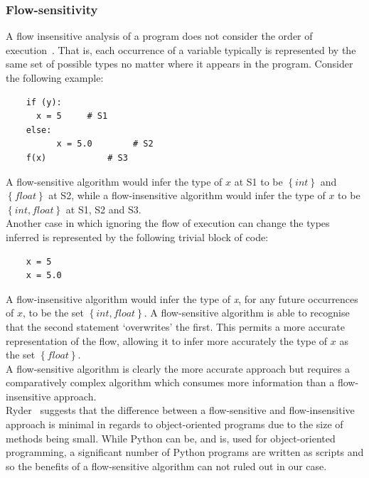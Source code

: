 \documentclass[12pt, titlepage]{article}
\begin{document}
\subsubsection{Flow-sensitivity}
A flow insensitive analysis of a program does not consider the order of execution~\cite{nielson99}. That is, each occurrence of a variable typically is represented by the same set of possible types no matter where it appears in the program. Consider the following example:
\begin{lstlisting}
	if (y):	
	  x = 5     # S1
	else:
          x = 5.0        # S2
	f(x)		    # S3
\end{lstlisting}
A flow-sensitive algorithm would infer the type of $x$ at S1 to be $\left\{ {int}\right\}$ and $\left\{ {float}\right\}$ at S2, while a flow-insensitive algorithm would infer the type of $x$ to be $\left\{ {int, float}\right\}$ at S1, S2 and S3. \\
Another case in which ignoring the flow of execution can change the types inferred is represented by the following trivial block of code:
\begin{lstlisting}
	x = 5
	x = 5.0
\end{lstlisting}
A flow-insensitive algorithm would infer the type of \textit{x}, for any future occurrences of $x$, to be the set $\left\{ {int, float}\right\}$. A flow-sensitive algorithm is able to recognise that the second statement `overwrites' the first. This permits a more accurate representation of the flow, allowing it to infer more accurately the type of $x$ as the set $\left\{ {float}\right\}$. \\
A flow-sensitive algorithm is clearly the more accurate approach but requires a comparatively complex algorithm which consumes more information than a flow-insensitive approach. \\
Ryder~\cite{ryder03} suggests that the difference between a flow-sensitive and flow-insensitive approach is minimal in regards to object-oriented programs due to the size of methods being small. While Python can be, and is, used for object-oriented programming, a significant number of Python programs are written as scripts and so the benefits of a flow-sensitive algorithm can not ruled out in our case.
\end{document}
